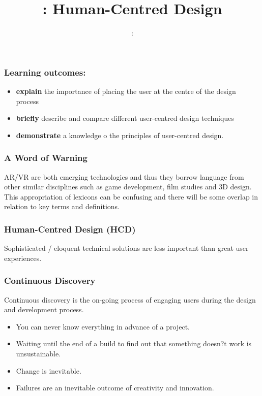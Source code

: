 \usepackage{../../beamerthemeFalmouthGamesAcademy}
\usepackage{multimedia}
\graphicspath{ {../../} }


\usepackage[normalem]{ulem}
\usepackage{wasysym}

\usepackage{pdfpages}

\usetikzlibrary{arrows,automata}




\title{\sessionnumber: Human-Centred Design}
\subtitle{\modulecode: \moduletitle}

\frame{\titlepage} 

\begin{frame}
	\frametitle{Learning outcomes:}
	\begin{itemize}
		\item \textbf{explain} the importance of placing the user at the centre of the design process
		\item \textbf{briefly} describe and compare different user-centred design techniques
		\item \textbf{demonstrate} a knowledge o the principles of user-centred design.	
	\end{itemize}
\end{frame}

\begin{frame}
	\frametitle{A Word of Warning}
	AR/VR are both emerging technologies and thus they borrow language from other similar disciplines such as game development, film studies and 3D design. This appropriation of lexicons can be confusing and there will be some overlap in relation to key terms and definitions.
\end{frame}

\begin{frame}
	\frametitle{Human-Centred Design (HCD)}
	
	Sophisticated / eloquent technical solutions are less important than great user experiences.
\end{frame}

\begin{frame}
	\frametitle{Continuous Discovery}
	Continuous discovery is the on-going process of engaging users during the design and development process. 
	\begin{itemize}
		\item \pause You can never know everything in advance of a project.
		\item \pause Waiting until the end of a build to find out that something doesn?t work is unsustainable. 
		\item \pause Change is inevitable.
		\item \pause Failures are an inevitable outcome of creativity and innovation. 
	\end{itemize}
\end{frame}	

